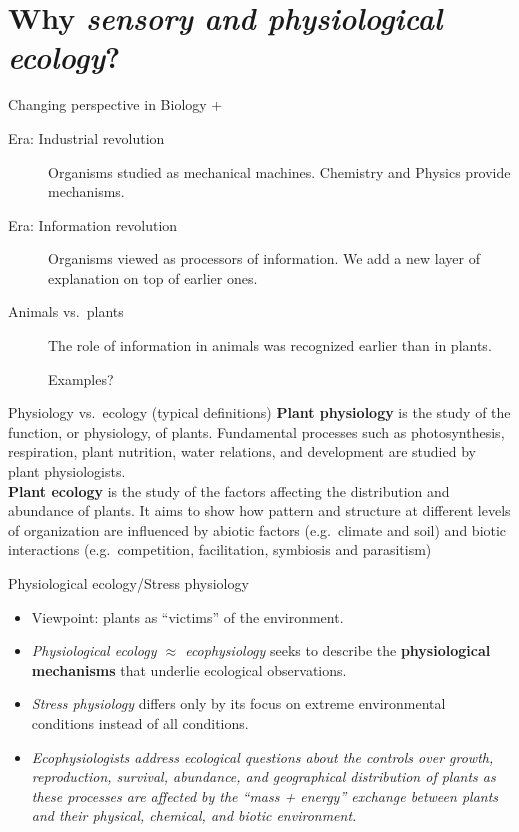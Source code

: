 \documentclass[10pt]{beamer}
\begin{document}
\section{Why \emph{sensory and physiological ecology}?}
\nocite{Dusenbery1992,Taiz2014}
\begin{frame}{Changing perspective in Biology + \Discussion}
  \begin{description}
    \item[Era: Industrial revolution] Organisms studied as mechanical machines. Chemistry and Physics provide mechanisms.
    \item[Era: Information revolution] Organisms viewed as processors of information. We add a new layer of explanation on top of earlier ones.
    \item[Animals vs.\ plants] The role of information in animals was recognized earlier than in plants.
    \item[\DiscussionI] Examples?
  \end{description}
\end{frame}

\begin{frame}{Physiology vs.\ ecology (typical definitions)}
    \textbf{Plant physiology} is the study of the function,
    or physiology, of plants. Fundamental processes such as
    photosynthesis, respiration, plant nutrition, water
    relations, and development are studied by plant physiologists.\\[2ex]

    \textbf{Plant ecology} is the study of the factors affecting the distribution and abundance
    of plants. It aims to show how pattern and structure at
    different levels of organization are influenced by abiotic
    factors (e.g.\ climate and soil) and biotic interactions
    (e.g.\ competition, facilitation, symbiosis and parasitism)
    \\  
\end{frame}

\begin{frame}{Physiological ecology/Stress physiology}
    \nocite{Lambers2008,Lambers2019}
    \begin{itemize}
        \item Viewpoint: plants as ``victims'' of the environment.
        \item \emph{Physiological ecology $\approx$ ecophysiology} seeks to describe the
        \textbf{physiological mechanisms} that underlie ecological
        observations.
        \item \emph{Stress physiology} differs only by its focus on extreme environmental conditions instead of all conditions.
        \item \emph{Ecophysiologists address ecological questions about
        the controls over growth, reproduction, survival, abundance,
        and geographical distribution of plants as these processes
        are affected by the ``mass + energy'' exchange between plants and their
        physical, chemical, and biotic environment.}
    \end{itemize}
\end{frame}
\end{document}
